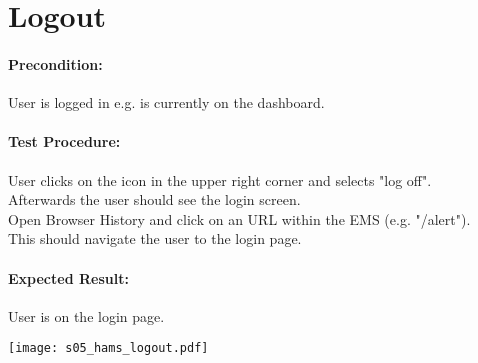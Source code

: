 \documentclass{scrreprt}
\begin{document}
\begin{minipage}[c]{0.4\textwidth}
\section{Logout}

\paragraph{Precondition:}
User is logged in e.g. is currently on the dashboard.
\\
\paragraph{Test Procedure:}
User clicks on the icon in the upper right corner and selects "log off". \\
Afterwards the user should see the login screen.\\
Open Browser History and click on an URL within the EMS (e.g. "/alert").\\
This should navigate the user to the login page.\\

\paragraph{Expected Result:}
User is on the login page.

\end{minipage}
\hfill
\begin{minipage}[c]{0.5\textwidth}
	\texttt{[image: s05\_hams\_logout.pdf]}
\end{minipage}
\end{document}
